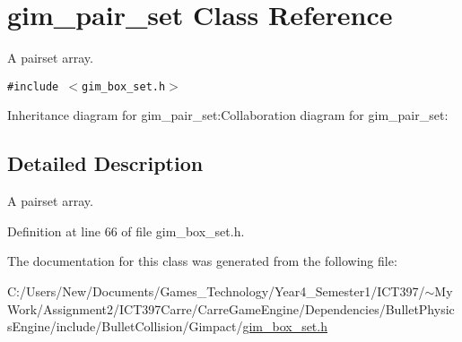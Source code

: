 \hypertarget{classgim__pair__set}{
\section{gim\_\-pair\_\-set Class Reference}
\label{classgim__pair__set}
}
A pairset array.  


{\tt \#include $<$gim\_\-box\_\-set.h$>$}

Inheritance diagram for gim\_\-pair\_\-set:Collaboration diagram for gim\_\-pair\_\-set:

\subsection{Detailed Description}
A pairset array. 

Definition at line 66 of file gim\_\-box\_\-set.h.

The documentation for this class was generated from the following file:\begin{CompactItemize}
\item 
C:/Users/New/Documents/Games\_\-Technology/Year4\_\-Semester1/ICT397/$\sim$My Work/Assignment2/ICT397Carre/CarreGameEngine/Dependencies/BulletPhysicsEngine/include/BulletCollision/Gimpact/\hyperlink{gim__box__set_8h}{gim\_\-box\_\-set.h}\end{CompactItemize}
